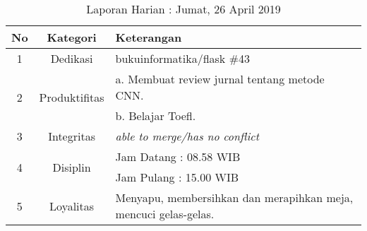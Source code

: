 \begin{table}[htp]
\begin{center}
\caption{Laporan Harian : Jumat, 26 April 2019}
\label{tab:lh260419}
\begin{tabularx}{\textwidth}{|l|l|X|}
\hline
\multicolumn{1}{|c|}{\textbf{No}} & \multicolumn{1}{c|}{\textbf{Kategori}} & \textbf{Keterangan} \\ \hline
\multicolumn{1}{|c|}{\multirow{1}{*}{1}} & \multicolumn{1}{c|}{\multirow{1}{*}{\parbox{2.5cm}{Dedikasi}}}
& bukuinformatika/flask \#43\\
\hline
\multicolumn{1}{|c|}{\multirow{2}{*}{2}} & \multicolumn{1}{c|}{\multirow{2}{*}{\parbox{2.5cm}{Produktifitas}}}
& a. Membuat review jurnal tentang metode CNN.\\
\multicolumn{1}{|c|}{\multirow{1}{*}{}} & \multicolumn{1}{c|}{\multirow{1}{*}{\parbox{2.5cm}{}}}
& b. Belajar Toefl.\\
\hline
\multicolumn{1}{|c|}{\multirow{1}{*}{3}} & \multicolumn{1}{c|}{\multirow{1}{*}{\parbox{2.5cm}{Integritas}}}
& \textit{able to merge/has no conflict} \\
\hline
\multicolumn{1}{|c|}{\multirow{2}{*}{4}} & \multicolumn{1}{c|}{\multirow{2}{*}{\parbox{2.5cm}{Disiplin}}}
& Jam Datang : 08.58 WIB \\
\multicolumn{1}{|c|}{\multirow{1}{*}{}} & \multicolumn{1}{c|}{\multirow{1}{*}{\parbox{2.5cm}{}}}
& Jam Pulang : 15.00 WIB \\
\hline
\multicolumn{1}{|c|}{\multirow{2}{*}{5}} & \multicolumn{1}{c|}{\multirow{2}{*}{\parbox{2.5cm}{Loyalitas}}}
& Menyapu, membersihkan dan merapihkan meja, mencuci gelas-gelas.\\
\hline
\end{tabularx}
\end{center}
\end{table}